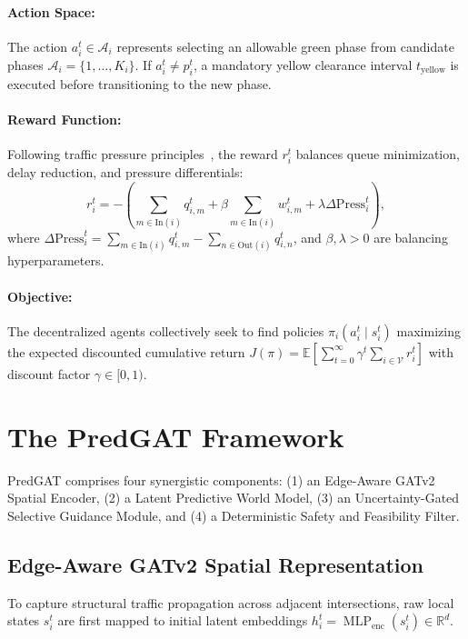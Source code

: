 \documentclass[11pt,a4paper,twocolumn]{article}
\begin{document}
\paragraph{Action Space:} The action $a_i^t \in \mathcal{A}_i$ represents selecting an allowable green phase from candidate phases $\mathcal{A}_i = \{1, \dots, K_i\}$. If $a_i^t \neq p_i^t$, a mandatory yellow clearance interval $t_{\text{yellow}}$ is executed before transitioning to the new phase.

\paragraph{Reward Function:} Following traffic pressure principles~\cite{wei2019presslight}, the reward $r_i^t$ balances queue minimization, delay reduction, and pressure differentials:
\begin{equation}
    r_i^t = - \left( \sum_{m \in \text{In}(i)} q_{i,m}^t + \beta \sum_{m \in \text{In}(i)} w_{i,m}^t + \lambda \Delta \text{Press}_i^t \right),
\end{equation}
where $\Delta \text{Press}_i^t = \sum_{m \in \text{In}(i)} q_{i,m}^t - \sum_{n \in \text{Out}(i)} q_{i,n}^t$, and $\beta, \lambda > 0$ are balancing hyperparameters.

\paragraph{Objective:} The decentralized agents collectively seek to find policies $\pi_i(a_i^t \mid s_i^t)$ maximizing the expected discounted cumulative return $J(\pi) = \mathbb{E}\left[ \sum_{t=0}^\infty \gamma^t \sum_{i \in \mathcal{V}} r_i^t \right]$ with discount factor $\gamma \in [0, 1)$.

\section{The PredGAT Framework}
\label{sec:predgat}

PredGAT comprises four synergistic components: (1) an Edge-Aware GATv2 Spatial Encoder, (2) a Latent Predictive World Model, (3) an Uncertainty-Gated Selective Guidance Module, and (4) a Deterministic Safety and Feasibility Filter.

\subsection{Edge-Aware GATv2 Spatial Representation}
To capture structural traffic propagation across adjacent intersections, raw local states $s_i^t$ are first mapped to initial latent embeddings $h_i^t = \operatorname{MLP}_{\text{enc}}(s_i^t) \in \mathbb{R}^d$. 
\end{document}

